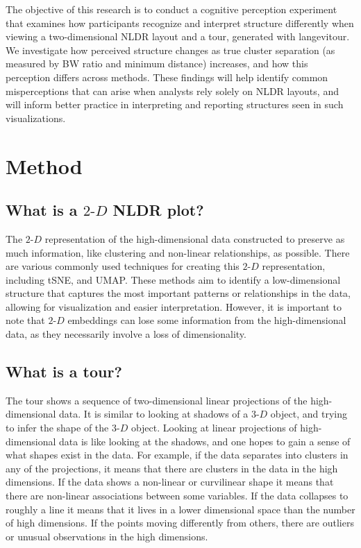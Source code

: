 \documentclass[
  11pt,
  a4paper,
]{report}
\newcommand\gD{$2\text{-}D$}
\begin{document}
The objective of this research is to conduct a cognitive perception
experiment that examines how participants recognize and interpret
structure differently when viewing a two-dimensional NLDR layout and a
tour, generated with langevitour. We investigate how perceived structure
changes as true cluster separation (as measured by BW ratio and minimum
distance) increases, and how this perception differs across methods.
These findings will help identify common misperceptions that can arise
when analysts rely solely on NLDR layouts, and will inform better
practice in interpreting and reporting structures seen in such
visualizations.

\section{Method}\label{sec-experiment}

\subsection{\texorpdfstring{What is a \gD{} NLDR
plot?}{What is a  NLDR plot?}}\label{what-is-a-nldr-plot}

The \gD{} representation of the high-dimensional data constructed to
preserve as much information, like clustering and non-linear
relationships, as possible. There are various commonly used techniques
for creating this \gD{} representation, including tSNE, and UMAP. These
methods aim to identify a low-dimensional structure that captures the
most important patterns or relationships in the data, allowing for
visualization and easier interpretation. However, it is important to
note that \gD{} embeddings can lose some information from the
high-dimensional data, as they necessarily involve a loss of
dimensionality.

\subsection{What is a tour?}\label{what-is-a-tour}

The tour shows a sequence of two-dimensional linear projections of the
high-dimensional data. It is similar to looking at shadows of a
\(3\text{-}D\) object, and trying to infer the shape of the
\(3\text{-}D\) object. Looking at linear projections of high-dimensional
data is like looking at the shadows, and one hopes to gain a sense of
what shapes exist in the data. For example, if the data separates into
clusters in any of the projections, it means that there are clusters in
the data in the high dimensions. If the data shows a non-linear or
curvilinear shape it means that there are non-linear associations
between some variables. If the data collapses to roughly a line it means
that it lives in a lower dimensional space than the number of high
dimensions. If the points moving differently from others, there are
outliers or unusual observations in the high dimensions.
\end{document}
